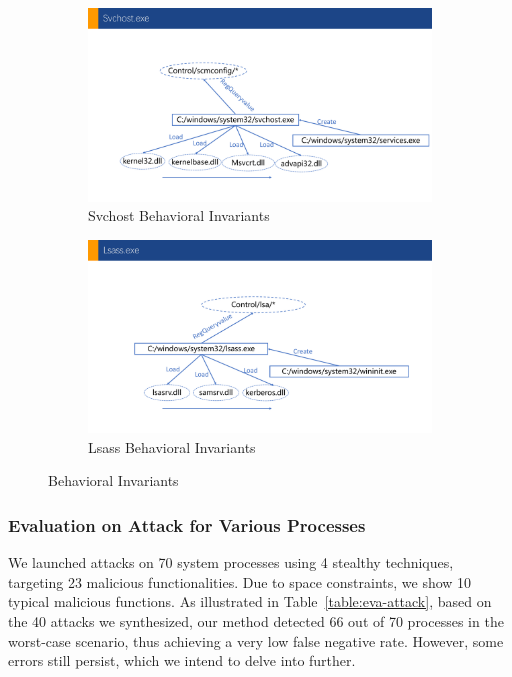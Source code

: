 \begin{figure}
\begin{minipage}[b]{0.34\textwidth}
  \begin{subfigure}{.99\textwidth}
      \includegraphics[width=\textwidth]{figs/svchost.pdf}
      \caption{Svchost Behavioral Invariants}
      \label{fig:svc-cons}
  \end{subfigure}
  \hfill
  \vspace{0.9cm}
  \begin{subfigure}{.99\textwidth}
      \includegraphics[width=\textwidth]{figs/lsass.pdf}
      \caption{Lsass Behavioral Invariants}
      \label{fig:lsass-cons}
  \end{subfigure}
  \vspace{-0.9cm}
\caption{Behavioral Invariants}
\label{fig-fdh}
\end{minipage}
\end{figure}

\subsubsection{Evaluation on Attack for Various Processes}
We launched attacks on 70 system processes using 4 stealthy techniques, targeting 23 malicious functionalities. Due to space constraints, we show 10 typical malicious functions.
As illustrated in Table~\ref{table:eva-attack}, based on the 40 attacks we synthesized, our method detected 66 out of 70 processes in the worst-case scenario, thus achieving a very low false negative rate.
However, some errors still persist, which we intend to delve into further.

